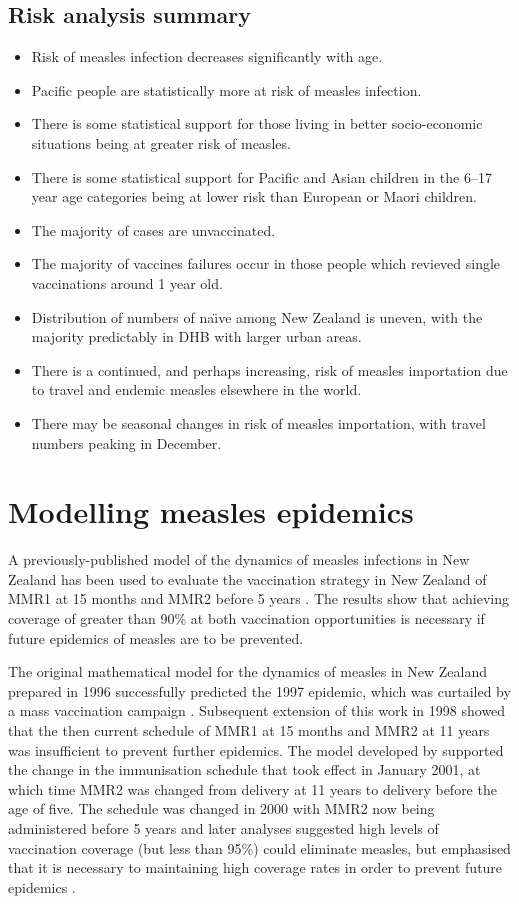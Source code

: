 \documentclass{article}
\begin{document}
\begin{itemize}
\subsection{Risk analysis summary}
\begin{itemize}
\item Risk of measles infection decreases significantly with age.
\item Pacific people are statistically more at risk of measles infection.
\item There is some statistical support for those living in better socio-economic situations being at greater risk of measles.
\item There is some statistical support for Pacific and Asian children in the 6--17 year age categories being at lower risk than European or Maori children.
\item The majority of cases are unvaccinated.
\item The majority of vaccines failures occur in those people which revieved single vaccinations around 1 year old.
\item Distribution of numbers of na\"{\i}ve among New Zealand is uneven, with the majority predictably in DHB with larger urban areas.
\item There is a continued, and perhaps increasing, risk of measles importation due to travel and endemic measles elsewhere in the world.
\item There may be seasonal changes in risk of measles importation, with travel numbers peaking in December.
\end{itemize}

\section{Modelling measles epidemics}
\label{sec:epidemic_modelling}

A previously-published model of the dynamics of measles infections in New Zealand has been used to evaluate the vaccination strategy in New Zealand of MMR1 at 15 months and MMR2 before 5 years \citep{roberts0,roberts4,tobias98}. The results show that achieving coverage of greater than 90\% at both vaccination opportunities is necessary if future epidemics of measles are to be prevented.

The original mathematical model for the dynamics of measles in New Zealand prepared in 1996 \citep{tobias98} successfully predicted the 1997 epidemic, which was curtailed by a mass vaccination campaign \citep{mansoor98,roberts0}. Subsequent extension of this work in 1998 showed that the then current schedule of MMR1 at 15 months and MMR2 at 11 years was insufficient to prevent further epidemics. The model developed by \citep{roberts0} supported the change in the immunisation schedule that took effect in January 2001, at which time MMR2 was changed from delivery at 11 years to delivery before the age of five. The schedule was changed in 2000 with MMR2 now being administered before 5 years \citep{anon2a} and later analyses suggested high levels of vaccination coverage (but less than 95\%) could eliminate measles, but emphasised that it is necessary to maintaining high coverage rates in order to prevent future epidemics \citep{roberts4}.


\end{itemize}
\end{document}
